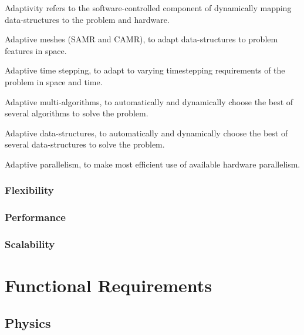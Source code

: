 \documentclass{article}
\begin{document}
   Adaptivity refers to the software-controlled component of
   dynamically mapping data-structures to the problem and
   hardware.
 

   Adaptive meshes (SAMR and CAMR), to adapt data-structures to problem
   features in space.

   Adaptive time stepping, to adapt to varying timestepping
   requirements of the problem in space and time.

   Adaptive multi-algorithms, to automatically and dynamically choose
   the best of several algorithms to solve the problem.

   Adaptive data-structures, to automatically and dynamically choose
   the best of several data-structures to solve the problem.

   Adaptive parallelism, to make most efficient use of available
   hardware parallelism.



\subsubsection{Flexibility}

\subsubsection{Performance}

\subsubsection{Scalability}

\section{Functional Requirements}

\subsection{Physics}
\end{document}
